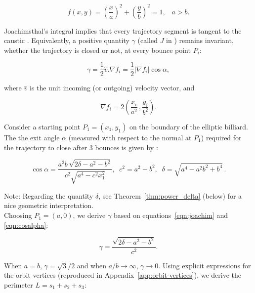 \documentclass{amsart}
\theoremstyle{definition}
\begin{document}
\begin{equation}
\label{eqn:billiard-f}
f(x,y)=\left(\frac{x}{a}\right)^2+\left(\frac{y}{b}\right)^2=1,\;\;\;a>b.
\end{equation}

Joachimsthal's integral implies that every trajectory segment is tangent to the caustic \cite{sergei91}. Equivalently, a positive quantity $\gamma$ (called $J$ in \cite{akopyan2020-invariants,bialy2020-invariants}) remains invariant, whether the trajectory is closed or not, at every bounce point $P_i$:

\begin{equation}
 \gamma=\frac{1}{2}\hat{v}.\nabla{f_i}=\frac{1}{2}|\nabla{f_i}|\cos\alpha,
 \label{eqn:joachim}
\end{equation}

\noindent where $\hat{v}$ is the unit incoming (or outgoing) velocity vector, and

\begin{equation*}
\nabla{f_i}=2\left(\frac{x_i}{a^2}\,,\frac{y_i}{b^2}\right).
\label{eqn:fnable}
\end{equation*}

Consider a starting point $P_1=(x_1,y_1)$ on the boundary of the elliptic billiard. The the exit angle $\alpha$ (measured with respect to the normal at $P_1$) required for the trajectory to close after 3 bounces is given by \cite{garcia2019-ellipses}: 

\begin{equation}
\cos{\alpha}={\frac {a^2 b \, \sqrt {2 \delta-{a}^{2}-{b}^{2}}}{{c}^{2}\sqrt {{a}^{4}-{c}^{2} x_1^{2}}}}, \;\; c^2=a^2-b^2,\;\; \delta=\sqrt{a^4-a^2b^2+b^4}\,.
\label{eqn:cosalpha}
\end{equation}

\noindent Note: Regarding the quantity $\delta$, see Theorem~\ref{thm:power_delta} (below) for a nice geometric interpretation. \\

Choosing $P_1=(a,0)$, we derive $\gamma$ based on equations~\eqref{eqn:joachim} and \eqref{eqn:cosalpha}:

\begin{equation}
\gamma=\frac{\sqrt{2\delta-a^2-b^2}}{c^2}.
\end{equation}

\noindent When $a=b$, $\gamma=\sqrt{3}/2$ and when $a/b{\to}\infty$, $\gamma{\to}0$. \noindent Using explicit expressions for the orbit vertices \cite{garcia2019-ellipses} (reproduced in Appendix~\ref{app:orbit-vertices}), we derive the perimeter $L=s_1+s_2+s_3$: 
\end{document}
